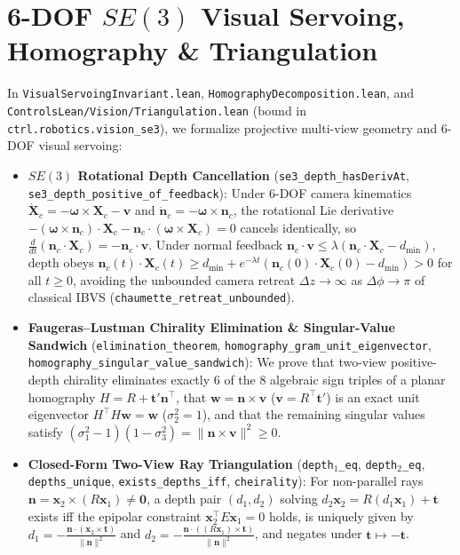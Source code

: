 \documentclass[10pt,twocolumn]{article}
\theoremstyle{definition}
\begin{document}
\section{6-DOF $SE(3)$ Visual Servoing, Homography \& Triangulation}

In \texttt{VisualServoingInvariant.lean}, \texttt{HomographyDecomposition.lean}, and \texttt{ControlsLean/Vision/Triangulation.lean} (bound in \texttt{ctrl.robotics.vision\_se3}), we formalize projective multi-view geometry and 6-DOF visual servoing:
\begin{itemize}[leftmargin=1.4em,itemsep=2pt]
  \item \textbf{$SE(3)$ Rotational Depth Cancellation} (\texttt{se3\_depth\_hasDerivAt}, \texttt{se3\_depth\_positive\_of\_feedback}): Under 6-DOF camera kinematics $\dot{\mathbf{X}}_c = -\boldsymbol{\omega}\times\mathbf{X}_c - \mathbf{v}$ and $\dot{\mathbf{n}}_c = -\boldsymbol{\omega}\times\mathbf{n}_c$, the rotational Lie derivative $-(\boldsymbol{\omega}\times\mathbf{n}_c)\cdot\mathbf{X}_c - \mathbf{n}_c\cdot(\boldsymbol{\omega}\times\mathbf{X}_c) = 0$ cancels identically, so $\frac{d}{dt}(\mathbf{n}_c\cdot\mathbf{X}_c) = -\mathbf{n}_c\cdot\mathbf{v}$. Under normal feedback $\mathbf{n}_c\cdot\mathbf{v} \le \lambda(\mathbf{n}_c\cdot\mathbf{X}_c - d_{\min})$, depth obeys $\mathbf{n}_c(t)\cdot\mathbf{X}_c(t) \ge d_{\min} + e^{-\lambda t}(\mathbf{n}_c(0)\cdot\mathbf{X}_c(0) - d_{\min}) > 0$ for all $t \ge 0$, avoiding the unbounded camera retreat $\Delta z \to \infty$ as $\Delta\phi \to \pi$ of classical IBVS (\texttt{chaumette\_retreat\_unbounded}).
  \item \textbf{Faugeras--Lustman Chirality Elimination \& Singular-Value Sandwich} (\texttt{elimination\_theorem}, \texttt{homography\_gram\_unit\_eigenvector}, \texttt{homography\_singular\_value\_sandwich}): We prove that two-view positive-depth chirality eliminates exactly 6 of the 8 algebraic sign triples of a planar homography $H = R + \mathbf{t}'\mathbf{n}^\top$, that $\mathbf{w} = \mathbf{n}\times\mathbf{v}$ ($\mathbf{v} = R^\top\mathbf{t}'$) is an exact unit eigenvector $H^\top H\mathbf{w} = \mathbf{w}$ ($\sigma_2^2 = 1$), and that the remaining singular values satisfy $(\sigma_1^2 - 1)(1 - \sigma_3^2) = \|\mathbf{n}\times\mathbf{v}\|^2 \ge 0$.
  \item \textbf{Closed-Form Two-View Ray Triangulation} (\texttt{depth$_1$\_eq}, \texttt{depth$_2$\_eq}, \texttt{depths\_unique}, \texttt{exists\_depths\_iff}, \texttt{cheirality}): For non-parallel rays $\mathbf{n} = \mathbf{x}_2 \times (R\mathbf{x}_1) \neq \mathbf{0}$, a depth pair $(d_1, d_2)$ solving $d_2\mathbf{x}_2 = R(d_1\mathbf{x}_1) + \mathbf{t}$ exists iff the epipolar constraint $\mathbf{x}_2^\top E \mathbf{x}_1 = 0$ holds, is uniquely given by $d_1 = -\frac{\mathbf{n}\cdot(\mathbf{x}_2\times\mathbf{t})}{\|\mathbf{n}\|^2}$ and $d_2 = -\frac{\mathbf{n}\cdot((R\mathbf{x}_1)\times\mathbf{t})}{\|\mathbf{n}\|^2}$, and negates under $\mathbf{t} \mapsto -\mathbf{t}$.
\end{itemize}
\end{document}
